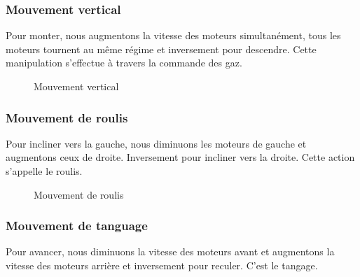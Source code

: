 	
	\subsubsection{Mouvement vertical}
	Pour monter, nous augmentons la vitesse des moteurs simultanément, tous les moteurs tournent au même régime et inversement pour descendre. Cette manipulation s'effectue à travers la commande des gaz.
	\begin{figure} [H]
	\begin{center}
		\centering
	\end{center}
	\caption{Mouvement vertical}
	\end{figure}

	\subsubsection{Mouvement de roulis}
	Pour incliner vers la gauche, nous diminuons les moteurs de gauche et augmentons ceux de droite. Inversement pour incliner vers la droite. Cette action s'appelle le roulis.
	\begin{figure} [H]
	\begin{center}
	
		\caption{Mouvement de roulis}
	\end{center}
	\end{figure}
	\subsubsection{Mouvement de tanguage}
	Pour avancer, nous diminuons la vitesse des moteurs avant et augmentons la vitesse des moteurs arrière et inversement pour reculer. C'est le tangage.
	
